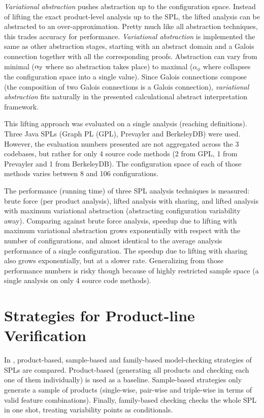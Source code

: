 \documentclass[11pt]{article}
\begin{document}
\emph{Variational abstraction} pushes abstraction up to the configuration space. Instead of lifting the exact product-level analysis up to the SPL, the lifted analysis can be abstracted to an over-approximation. Pretty much like all abstraction techniques, this trades accuracy for performance. \emph{Variational abstraction} is implemented the same as other abstraction stages, starting with an abstract domain and a Galois connection together with all the corresponding proofs. Abstraction can vary from minimal ($\alpha_{\mathbb{F}}$ where no abstraction takes place) to maximal ($\alpha_\phi$ where collapses the configuration space into a single value). Since Galois connections compose (the composition of two Galois connections is a Galois connection), \emph{variational abstraction} fits naturally in the presented calculational abstract interpretation framework.

This lifting approach was evaluated on a single analysis (reaching definitions). Three Java SPLs (Graph PL (GPL), Prevayler and BerkeleyDB) were used. However, the evaluation numbers presented are not aggregated across the 3 codebases, but rather for only 4 source code methods (2 from GPL, 1 from Prevayler and 1 from BerkeleyDB). The configuration space of each of those methods varies between 8 and 106 configurations.

The performance (running time) of three SPL analysis techniques is measured: brute force (per product analysis), lifted analysis with sharing, and lifted analysis with maximum variational abstraction (abstracting configuration variability away). Comparing against brute force analysis, speedup due to lifting with maximum variational abstraction grows exponentially with respect with the number of configurations, and almost identical to the average analysis performance of a single configuration. The speedup due to lifting with sharing also grows exponentially, but at a slower rate. Generalizing from those performance numbers is risky though because of highly restricted sample space (a single analysis on only 4 source code methods).

\section{Strategies for Product-line Verification}

In \cite{Apel:2013}, product-based, sample-based and family-based model-checking strategies of SPLs are compared. Product-based (generating all products and checking each one of them individually) is used as a baseline. Sample-based strategies only generate a sample of products (single-wise, pair-wise and triple-wise in terms of valid feature combinations). Finally, family-based checking checks the whole SPL in one shot, treating variability points as conditionals.
\end{document}
